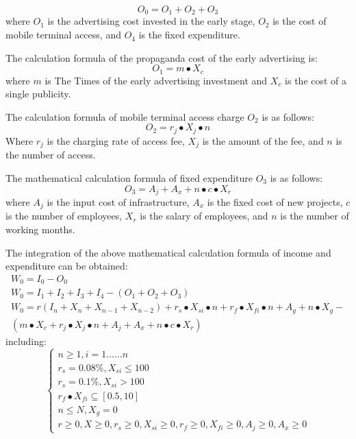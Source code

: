 \documentclass[../mcmpaper]{subfiles}
\begin{document}
\begin{equation}
O_0 = O_1 + O_2 + O_3
\end{equation}
where $O_1$ is the advertising cost invested in the early stage, $O_2$ is the cost of mobile terminal access, and $O_4$ is the fixed expenditure.
\par
The calculation formula of the propaganda cost of the early advertising is:
\begin{equation}
O_1 = m\bullet X_c
\end{equation}
where $m$ is The Times of the early advertising investment and $X_c$ is the cost of a single publicity.
\par
The calculation formula of mobile terminal access charge $O_2$ is as follows:
\begin{equation}
O_2 = r_j\bullet X_j\bullet n
\end{equation}
Where $r_j$ is the charging rate of access fee, $X_j$ is the amount of the fee, and $n$ is the number of access.
\par
The mathematical calculation formula of fixed expenditure $O_3$ is as follows:
\begin{equation}
O_3 = A_j + A_x + n\bullet c\bullet X_r
\end{equation}
where $A_j$ is the input cost of infrastructure, $A_x$ is the fixed cost of new projects, $c$ is the number of employees, $X_r$ is the salary of employees, and $n$ is the number of working months.
\par
The integration of the above mathematical calculation formula of income and expenditure can be obtained:
\begin{equation}
\begin{gathered}
W_{0}=I_{0}-O_{0} \\
W_{0}=I_{1}+I_{2}+I_{3}+I_{4}-\left(O_{1}+O_{2}+O_{3}\right) \\
W_{0}=r\left(I_{n}+X_{n}+X_{n-1}+X_{n-2}\right)+r_{s} \bullet X_{s i} \bullet n+r_{f} \bullet X_{f i} \bullet n+A_{g}+n \bullet X_{g}- \\
\left(m \bullet X_{c}+r_{j} \bullet X_{j} \bullet n+A_{j}+A_{x}+n \bullet c \bullet X_{r}\right)
\end{gathered}
\end{equation}
including:
\begin{equation}
\left\{\begin{array}{l}
n \geq 1, i=1 \ldots \ldots n \\
r_{s}=0.08 \%, X_{s i} \leq 100 \\
r_{s}=0.1 \%, X_{s i}>100 \\
r_{f} \bullet X_{f i} \subseteq[0.5,10] \\
n \leq N, X_{g}=0 \\
r \geq 0, X \geq 0, r_{s} \geq 0, X_{s i} \geq 0, r_{f} \geq 0, X_{f i} \geq 0, A_{j} \geq 0, A_{x} \geq 0
\end{array}\right.
\end{equation}
\end{document}

